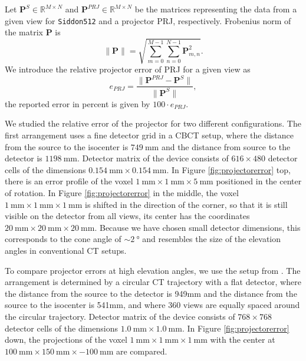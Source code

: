 Let $\mathbf{P}^{S} \in \mathbb{R}^{M \times N}$ and $\mathbf{P}^{PRJ} \in \mathbb{R}^{M \times N}$ be the matrices representing the data from a given view for \texttt{Siddon512} and a projector PRJ, respectively. Frobenius norm of the matrix $\mathbf{P}$ is
\begin{equation}
    \|\mathbf{P}\| = \sqrt{\sum_{m=0}^{M-1} \sum_{n=0}^{N-1} \mathbf{P}^2_{m,n}}.
\end{equation}
We introduce the relative projector error of PRJ for a given view as 
\begin{equation}
    e_{PRJ} = \frac{\|\mathbf{P}^{PRJ}-\mathbf{P}^{S}\|}{\|\mathbf{P}^{S}\|},
\end{equation}
the reported error in percent is given by $100\cdot e_{PRJ}$.

We studied the relative error of the projector for two different configurations. The first arrangement uses a fine detector grid in a CBCT setup, where the distance from the source to the isocenter is $\SI{749}{\milli \meter}$ and the distance from source to the detector is $\SI{1198}{\milli \meter}$. Detector matrix of the device consists of $616 \times 480$ detector cells of the dimensions $\SI{0.154}{\milli \meter} \times \SI{0.154}{\milli \meter}$. In Figure \ref{fig:projectorerror} top, there is an error profile of the voxel $\SI{1}{\milli \meter} \times \SI{1}{\milli \meter} \times \SI{5}{\milli \meter}$ positioned in the center of rotation. In Figure \ref{fig:projectorerror} in the middle, the voxel $\SI{1}{\milli \meter} \times \SI{1}{\milli \meter} \times \SI{1}{\milli \meter}$ is shifted in the direction of the corner, so that it is still visible on the detector from all views, its center has the coordinates $\SI{20}{\milli \meter} \times \SI{20}{\milli \meter} \times \SI{20}{\milli \meter}$. Because we have chosen small detector dimensions, this corresponds to the cone angle of $\sim \SI{2}{\degree}$ and resembles the size of the elevation angles in conventional CT setups.

To compare projector errors at high elevation angles, we use the setup from \cite{Long2010}. The arrangement is determined by a circular CT trajectory with a flat detector, where the distance from the source to the detector is 949mm and the distance from the source to the isocenter is 541mm, and where 360 views are equally spaced around the circular trajectory. Detector matrix of the device consists of $768 \times 768$ detector cells of the dimensions $\SI{1.0}{\milli \meter} \times \SI{1.0}{\milli \meter}$. In Figure \ref{fig:projectorerror} down, the projections of the voxel $\SI{1}{\milli \meter} \times \SI{1}{\milli \meter} \times \SI{1}{\milli \meter}$ with the center at $\SI{100}{\milli \meter} \times \SI{150}{\milli \meter} \times \SI{-100}{\milli \meter}$ are compared.

